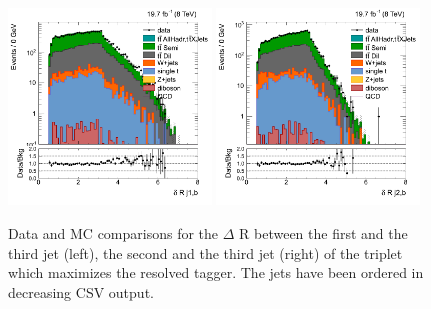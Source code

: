 \begin{figure}[htbp]
	\centering
	\includegraphics[width=0.48\textwidth]{figures/semilep_1tightmuo_resolved_3ormorejets_2ormorejetWPm_pfmetmore100_pfmtmore40_trigrequestonMC_17102015/hResBDTDRj1b.png}
	\includegraphics[width=0.48\textwidth]{figures/semilep_1tightmuo_resolved_3ormorejets_2ormorejetWPm_pfmetmore100_pfmtmore40_trigrequestonMC_17102015/hResBDTDRj2b.png}
	\caption{Data and MC comparisons for the $\Delta$ R between the first and the third jet (left), the second and the third jet (right) of the triplet which maximizes the resolved tagger. The jets have been ordered in decreasing CSV output.}
	\label{fig:dRj12b13TeV}
\end{figure}

